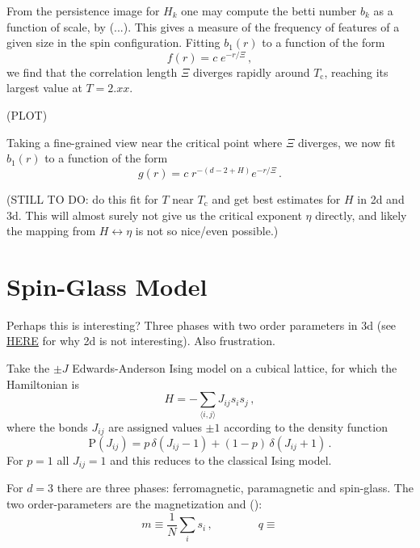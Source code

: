 \documentclass[11pt]{article}
\begin{document}
From the persistence image for $H_k$ one may compute the betti number $b_k$ as a function of scale, by (...). This gives a measure of the frequency of features of a given size in the spin configuration. Fitting $b_1(r)$ to a function of the form
\begin{equation}
	f(r) = c\; e^{-r/\Xi} \,,
\end{equation}	
we find that the correlation length $\Xi$ diverges rapidly around $T_\text{c}$, reaching its largest value at $T=2.xx$.

\bigskip
(PLOT)
\bigskip

Taking a fine-grained view near the critical point where $\Xi$ diverges, we now fit $b_1(r)$ to a function of the form
\begin{equation}
	g(r) = c\; r^{-(d-2+H)}e^{-r/\Xi} \,.
\end{equation}

\bigskip\bigskip
(STILL TO DO: do this fit for $T$ near $T_\text{c}$ and get best estimates for $H$ in 2d and 3d. This will almost surely not give us the critical exponent $\eta$ directly, and likely the mapping from $H\leftrightarrow\eta$ is not so nice/even possible.)


\newpage
\section{Spin-Glass Model}
Perhaps this is interesting? Three phases with two order parameters in 3d (see \href{https://journals.aps.org/prl/pdf/10.1103/PhysRevLett.43.1615}{HERE} for why 2d is not interesting). Also frustration.

\bigskip\bigskip

Take the $\pm J$ Edwards-Anderson Ising model on a cubical lattice, for which the Hamiltonian is
\begin{equation}
	H = -\sum_{\langle i,j\rangle}J_{ij}s_is_j \,,
\end{equation}
where the bonds $J_{ij}$ are assigned values $\pm1$ according to the density function
\begin{equation}
	\mathrm{P}(J_{ij}) = p\,\delta(J_{ij}-1) + (1-p)\,\delta(J_{ij}+1) \,.
\end{equation}
For $p=1$ all $J_{ij}=1$ and this reduces to the classical Ising model.

For $d=3$ there are three phases: ferromagnetic, paramagnetic and spin-glass. The two order-parameters are the magnetization and ():
\begin{equation}
	m \equiv \frac{1}{N}\sum_is_i \,, \qquad\qquad q \equiv 
\end{equation}
\end{document}

